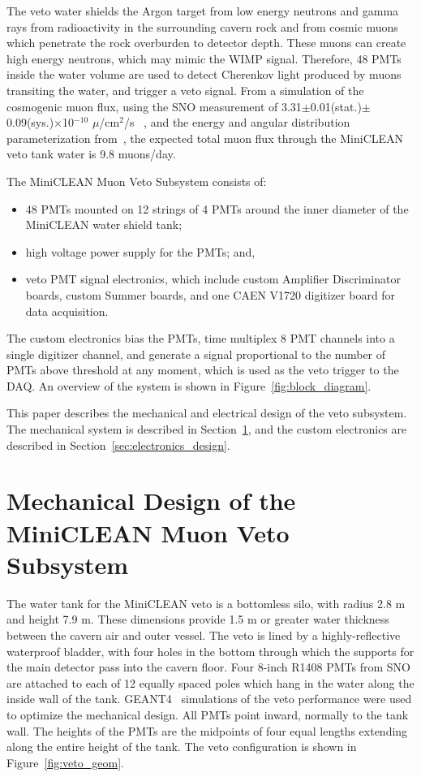 \documentclass[preprint,12pt]{elsarticle}
\begin{document}
The veto water shields the Argon target from low energy neutrons and gamma rays from radioactivity in the surrounding cavern rock and from cosmic muons which penetrate the rock overburden to detector depth.  These muons can create high energy neutrons, which may mimic the WIMP signal.  Therefore, 48 PMTs inside the water volume are used to detect Cherenkov light produced by muons transiting the water, and trigger a veto signal.  From a simulation of the cosmogenic muon flux, using the SNO measurement of 3.31$\pm$0.01(stat.)$\pm$0.09(sys.)$\times$10$^{-10}$ $\mu$/cm$^2$/s ~\cite{ref:sno_muon_flux}, and the energy and angular distribution parameterization from~\cite{ref:mei_and_hime}, the expected total muon flux through the MiniCLEAN veto tank water is 9.8 muons/day.  

The MiniCLEAN Muon Veto Subsystem consists of:
\begin{itemize}
\item 48 PMTs mounted on 12 strings of 4 PMTs around the inner diameter of the MiniCLEAN water shield tank;
\item high voltage power supply for the PMTs; and,
\item veto PMT signal electronics, which include custom Amplifier Discriminator boards, custom Summer boards, and one CAEN V1720 digitizer board for data acquisition.  
\end{itemize}
The custom electronics bias the PMTs, time multiplex 8 PMT channels into a single digitizer channel, and generate a signal proportional to the number of PMTs above threshold at any moment, which is used as the veto trigger to the DAQ.  An overview of the system is shown in Figure~\ref{fig:block_diagram}.

This paper describes the mechanical and electrical design of the veto subsystem.  The mechanical system is described in Section~\ref{sec:subsystem_design}, and the custom electronics are described in Section~\ref{sec:electronics_design}.


\section{Mechanical Design of the MiniCLEAN Muon Veto Subsystem}
\label{sec:subsystem_design}
%
The water tank for the MiniCLEAN veto is a bottomless silo, with
radius 2.8 m and height 7.9 m. These dimensions provide 1.5 m or
greater water thickness between the cavern air and outer vessel. The
veto is lined by a highly-reflective waterproof bladder, with four
holes in the bottom through which the supports for the main detector
pass into the cavern floor. Four 8-inch R1408 PMTs from SNO are
attached to each of 12 equally spaced poles which hang in the water
along the inside wall of the tank. GEANT4~\cite{ref:geant4} simulations
of the veto performance were used to optimize the mechanical
design. All PMTs point inward, normally to the tank wall. The heights
of the PMTs are the midpoints of four equal lengths extending along
the entire height of the tank. The veto configuration is shown in
Figure~\ref{fig:veto_geom}.  
\end{document}
